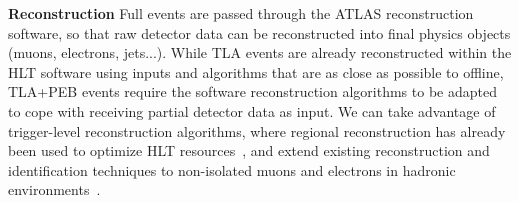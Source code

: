 \textbf{Reconstruction} Full events are passed through the ATLAS reconstruction software, so that raw detector data can be reconstructed into final physics objects (muons, electrons, jets...). 
While TLA events are already reconstructed within the HLT software using inputs and algorithms that are as close as possible to offline, 
TLA+PEB events require the software reconstruction algorithms to be adapted to cope with receiving partial detector data as input. 
We can take advantage of trigger-level reconstruction algorithms, where regional reconstruction has already been used to optimize HLT resources~\cite{ToBeCited}, %
and extend existing reconstruction and identification techniques to non-isolated muons and electrons in hadronic environments~\cite{ToBeCited}. %

